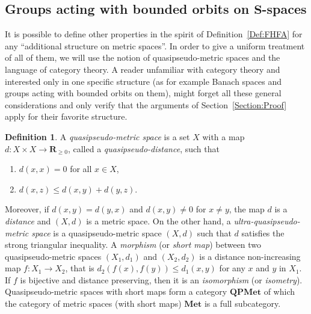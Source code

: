 \documentclass[a4paper]{article}
\theoremstyle{definition}
\newtheorem{defn}[lem]{Definition}
\newcommand*{\field}[1]{\mathbf{#1}}
\newcommand*{\R}{\field{R}}
\begin{document}
\subsection{Groups acting with bounded orbits on \texorpdfstring{$\mathbf S$}{\textbf{S}}-spaces}
It is possible to define other properties in the spirit of Definition~\ref{Def:FHFA} for any ``additional structure on metric spaces''.
In order to give a uniform treatment of all of them, we will use the notion of quasipseudo-metric spaces and the language of category theory.
A reader unfamiliar with category theory and interested only in one specific structure (as for example Banach spaces and groups acting with bounded orbits on them), might forget all these general considerations and only verify that the arguments of Section~\ref{Section:Proof} apply for their favorite structure.
%
%
\begin{defn}
A \emph{quasipseudo-metric space} is a set $X$ with a map $d\colon X\times X\to \R_{\geq0}$, called a \emph{quasipseudo-distance}, such that
\begin{enumerate}
\item $d(x,x)=0$ for all $x\in X$,
\item $d(x,z)\leq d(x,y)+d(y,z)$.
\end{enumerate}
\end{defn}
%
%
Moreover, if $d(x,y)=d(y,x)$ and $d(x,y)\neq 0$ for $x\neq y$, the map $d$ is a \emph{distance} and $(X,d)$ is a metric space.
On the other hand, a \emph{ultra-quasipseudo-metric space} is a quasipseudo-metric space $(X,d)$ such that $d$ satisfies the strong triangular inequality.
A \emph{morphism} (or \emph{short map}) between two quasipseudo-metric spaces $(X_1,d_1)$ and $(X_2,d_2)$ is a distance non-increasing map $f\colon X_1\to X_2$, that is $d_2(f(x),f(y))\leq d_1(x,y)$ for any $x$ and $y$ in $X_1$.
If $f$ is bijective and distance preserving, then it is an \emph{isomorphism} (or \emph{isometry}).
Quasipseudo-metric spaces with short maps form a category $\mathbf{QPMet}$ of which the category of metric spaces (with short maps) $\mathbf{Met}$ is a full subcategory.
\end{document}
